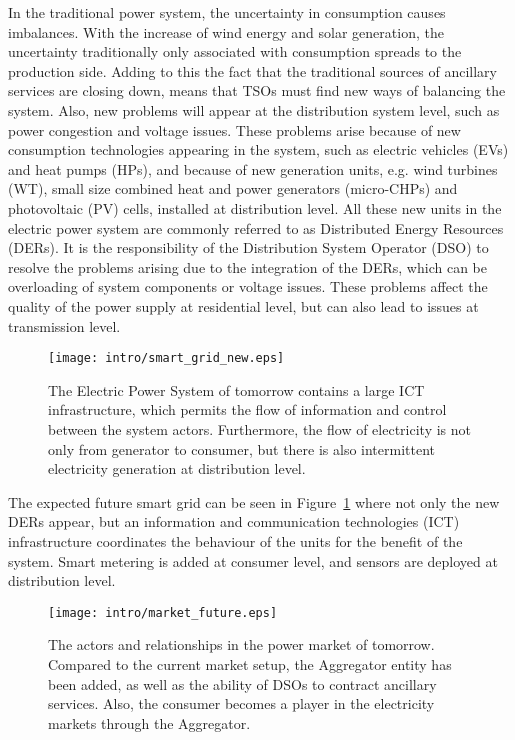 In the traditional power system, the uncertainty in consumption causes imbalances. With the increase of wind energy and solar generation, the uncertainty traditionally only associated with consumption spreads to the production side. Adding to this the fact that the traditional sources of ancillary services are closing down, means that TSOs must find new ways of balancing the system. Also, new problems will appear at the distribution system level, such as power congestion and voltage issues. These problems arise because of new consumption technologies appearing in the system, such as electric vehicles (EVs) and heat pumps (HPs), and because of new generation units, e.g. wind turbines (WT), small size combined heat and power generators (micro-CHPs) and photovoltaic (PV) cells, installed at distribution level. All these new units in the electric power system are commonly referred to as Distributed Energy Resources (DERs). It is the responsibility of the Distribution System Operator (DSO) to resolve the problems arising due to the integration of the DERs, which can be overloading of system components or voltage issues. These problems affect the quality of the power supply at residential level, but can also lead to issues at transmission level.
\begin{figure}[ht]
	\centering
	\caption{The Electric Power System of tomorrow contains a large ICT infrastructure, which permits the flow of information and control between the system actors. Furthermore, the flow of electricity is not only from generator to consumer, but there is also intermittent electricity generation at distribution level.}
	\texttt{[image: intro/smart\_grid\_new.eps]}\label{fig:powerfuture}
\end{figure}

The expected future smart grid can be seen in Figure~\ref{fig:powerfuture} where not only the new DERs appear, but an information and communication technologies (ICT) infrastructure coordinates the behaviour of the units for the benefit of the system. Smart metering is added at consumer level, and sensors are deployed at distribution level.
\begin{figure*}[b]
	\centering
	\caption{The actors and relationships in the power market of tomorrow. Compared to the current market setup, the Aggregator entity has been added, as well as the ability of DSOs to contract ancillary services. Also, the consumer becomes a player in the electricity markets through the Aggregator.}
	\texttt{[image: intro/market\_future.eps]}\label{fig:marketfuture}
\end{figure*}

